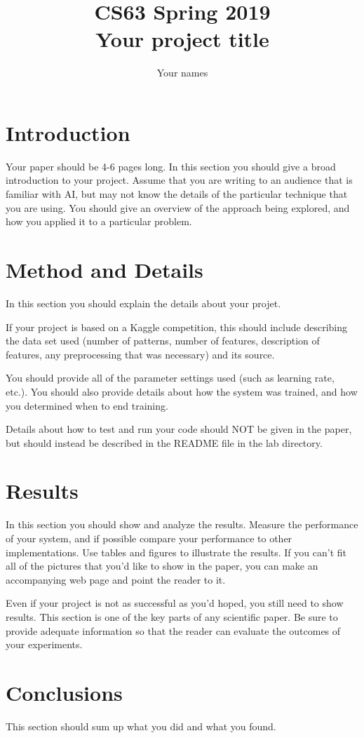 \documentclass[11pt]{article}
\title{CS63 Spring 2019\\Your project title}
\author{Your names}
\date{}
\begin{document}
\maketitle

\section{Introduction}

Your paper should be 4-6 pages long.  In this section you should give
a broad introduction to your project.  Assume that you are writing to
an audience that is familiar with AI, but may not know the details of
the particular technique that you are using.  You should give an
overview of the approach being explored, and how you applied it to a
particular problem.

\section{Method and Details}

In this section you should explain the details about your projet.

If your project is based on a Kaggle competition, this should include
describing the data set used (number of patterns, number of features,
description of features, any preprocessing that was necessary) and its
source.

You should provide all of the parameter settings used (such as
learning rate, etc.).  You should also provide details about how the
system was trained, and how you determined when to end training.

Details about how to test and run your code should NOT be given in the
paper, but should instead be described in the README file in the lab
directory.

\section{Results}

In this section you should show and analyze the results.  Measure the
performance of your system, and if possible compare your performance
to other implementations. Use tables and figures to illustrate the
results.  If you can't fit all of the pictures that you'd like to show
in the paper, you can make an accompanying web page and point the
reader to it.

Even if your project is not as successful as you'd hoped, you still
need to show results.  This section is one of the key parts of any
scientific paper.  Be sure to provide adequate information so that the
reader can evaluate the outcomes of your experiments.

\section{Conclusions}

This section should sum up what you did and what you found.
\end{document}
